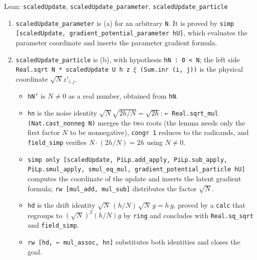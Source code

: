 \documentclass[11pt,a4paper]{article}
\begin{document}
\begin{leanbox}{Lean: \texttt{scaledUpdate}, \texttt{scaledUpdate\_\allowbreak{}parameter}, \texttt{scaledUpdate\_\allowbreak{}particle}}
\begin{enumerate}


\item \texttt{scaled\allowbreak{}Update\_\allowbreak{}parameter} is (a) for an arbitrary \texttt{N}. It is proved by \texttt{simp [scaled\allowbreak{}Update, gradient\_\allowbreak{}potential\_\allowbreak{}parameter h\allowbreak{}U]}, which evaluates the parameter coordinate and inserts the parameter gradient formula.

\item \texttt{scaled\allowbreak{}Update\_\allowbreak{}particle} is (b), with hypothesis \texttt{h\allowbreak{}N : 0 < N}; the left side \texttt{Real.\allowbreak{}sqrt N * scaled\allowbreak{}Update U h z \ensuremath{\xi} (Sum.\allowbreak{}inr (i, j))} is the physical coordinate \(\sqrt Nz'_{i,j}\).

\begin{itemize}


\item \texttt{h\allowbreak{}N'} is \(N\ne0\) as a real number, obtained from \texttt{h\allowbreak{}N}.

\item \texttt{hn} is the noise identity \(\sqrt N\sqrt{2h/N}=\sqrt{2h}\): \texttt{← Real.\allowbreak{}sqrt\_\allowbreak{}mul (Nat.\allowbreak{}cast\_\allowbreak{}nonneg N)} merges the two roots (the lemma needs only the first factor \(N\) to be nonnegative), \texttt{congr 1} reduces to the radicands, and \texttt{field\_\allowbreak{}simp} verifies \(N\cdot(2h/N)=2h\) using \(N\ne0\).

\item \texttt{simp only [scaled\allowbreak{}Update, Pi\allowbreak{}Lp.\allowbreak{}add\_\allowbreak{}apply, Pi\allowbreak{}Lp.\allowbreak{}sub\_\allowbreak{}apply, Pi\allowbreak{}Lp.\allowbreak{}smul\_\allowbreak{}apply, smul\_\allowbreak{}eq\_\allowbreak{}mul, gradient\_\allowbreak{}potential\_\allowbreak{}particle h\allowbreak{}U]} computes the coordinate of the update and inserts the latent gradient formula; \texttt{rw [mul\_\allowbreak{}add, mul\_\allowbreak{}sub]} distributes the factor \(\sqrt N\).

\item \texttt{hd} is the drift identity \(\sqrt N\,(h/N)\,\sqrt N\,g=h\,g\), proved by a \texttt{calc} that regroups to \((\sqrt N)^2(h/N)g\) by \texttt{ring} and concludes with \texttt{Real.\allowbreak{}sq\_\allowbreak{}sqrt} and \texttt{field\_\allowbreak{}simp}.

\item \texttt{rw [hd, ← mul\_\allowbreak{}assoc, hn]} substitutes both identities and closes the goal.

\end{itemize}


\end{enumerate}
\end{leanbox}
\end{document}

